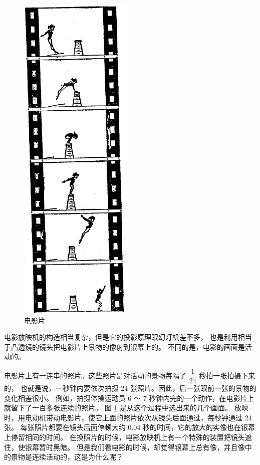 \begin{figure}
    \centering
    \includegraphics[width=5.5cm]{../pic/czwl2-ch1-31}
    \caption{电影片}\label{fig:1-31}
\end{figure}


电影放映机的构造相当复杂，但是它的投影原理跟幻灯机差不多，
也是利用相当于凸透镜的镜头把电影片上景物的像射到银幕上的。
不同的是，电影的画面是活动的。

\begin{enhancedline}
电影片上有一连串的照片。这些照片是对活动的景物每隔了 $\dfrac{1}{24}$ 秒拍一张拍摄下来的，
也就是说，一秒钟内要依次拍摄 24 张照片。因此，后一张跟前一张的景物的变化相差很小。
例如，拍摄体操运动员 6 ～ 7 秒钟内完的一个动作，在电影片上就留下了一百多张连续的照片。
图 \ref{fig:1-31} 是从这个过程中选出来的几个画面。
放映时，用电动机带动电影片，使它上面的照片依次从镜头后面通过，每秒钟通过 24 张。
每张照片都要在镜头后面停顿大约 0.04 秒的时间，它的放大的实像也在银幕上停留相同的时间。
在换照片的时候，电影放映机上有一个特殊的装置把镜头遮住，使银幕暂时黑暗。
但是我们看电影的时候，却觉得银幕上总有像，并且像中的景物是连续活动的，这是为什么呢？
\end{enhancedline}

